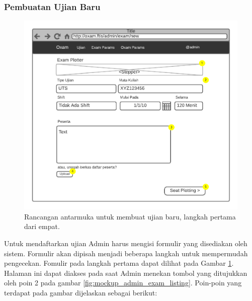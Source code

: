 \subsubsection{Pembuatan Ujian Baru}
    \begin{figure}
        \centering
        \includegraphics{Gambar/mockups/Mockup--Admin - NewExam-Step 1.pdf}
        \caption{Rancangan antarmuka untuk membuat ujian baru, langkah pertama dari empat.}
        \label{fig:mockup_admin_exam_create-1}
    \end{figure}
    Untuk mendaftarkan ujian Admin harus mengisi formulir yang disediakan oleh
    sistem. Formulir akan dipisah menjadi beberapa langkah untuk mempermudah
    pengecekan. Fomulir pada langkah pertama dapat dilihat pada Gambar
    \ref{fig:mockup_admin_exam_create-1}. Halaman ini dapat diakses pada saat
    Admin menekan tombol yang ditujukkan oleh poin 2 pada gambar
    \ref{fig:mockup_admin_exam_listing}. Poin-poin yang terdapat pada gambar
    dijelaskan sebagai berikut:
